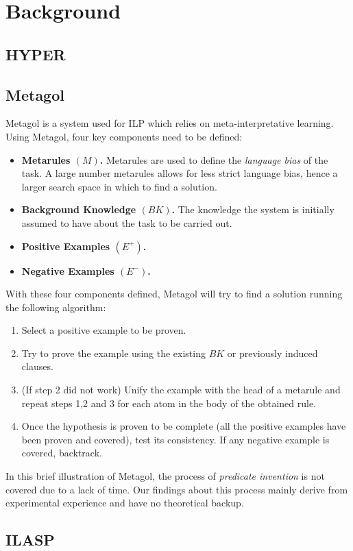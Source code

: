 \section{Background}\label{sec:back}

\subsection{HYPER}
\subsection{Metagol}
Metagol is a system used for ILP which relies on meta-interpretative learning.\\
Using Metagol, four key components need to be defined:
\begin{itemize}
    \item \textbf{Metarules \((M)\).} Metarules are used to define the \emph{language bias} of the task. A large number metarules allows for less strict language bias, hence a larger search space in which to find a solution. 
    \item \textbf{Background Knowledge \((BK)\).} The knowledge the system is initially assumed to have about the task to be carried out.
    \item \textbf{Positive Examples \((E^+)\).}
    \item \textbf{Negative Examples \((E^-)\).}
\end{itemize}
With these four components defined, Metagol will try to find a solution running the following algorithm:
\begin{enumerate}
    \item Select a positive example to be proven.
    \item Try to prove the example using the existing \(BK\) or previously induced clauses.
    \item (If step 2 did not work) Unify the example with the head of a metarule and repeat steps 1,2 and 3 for each atom in the body of the obtained rule.
    \item Once the hypothesis is proven to be complete (all the positive examples have been proven and covered), test its consistency. If any negative example is covered, backtrack.
\end{enumerate}

In this brief illustration of Metagol, the process of \emph{predicate invention} is not covered due to a lack of time. Our findings about this process mainly derive
from experimental experience and have no theoretical backup.


\subsection{ILASP}